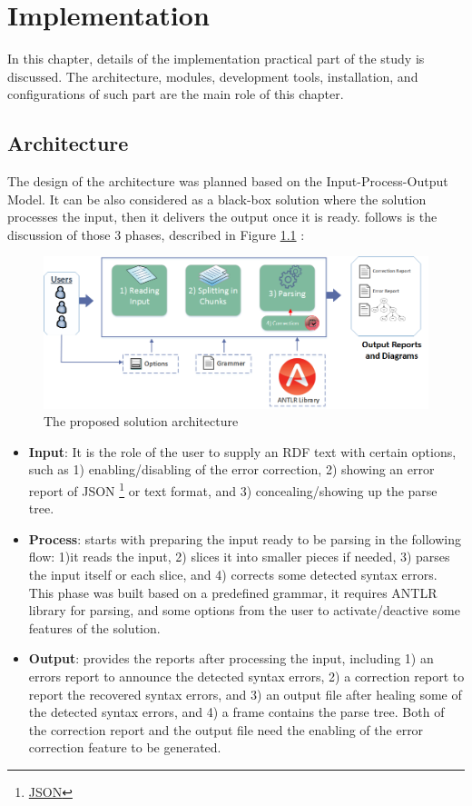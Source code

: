 \chapter{Implementation}
\label{ch:implementation}


In this chapter, details of the implementation practical part of the study is discussed. The architecture, modules, development tools, installation, and configurations of such part are the main role of this chapter.    
\section {Architecture}
The design of the architecture was planned based on the Input-Process-Output Model. It can be also considered as a black-box solution where the solution processes the input, then it delivers the output once it is ready. follows is the discussion of those 3 phases, described in Figure \ref{Fig:Architecture} : 
 \begin{figure}[ht]
	\begin{center}
		\includegraphics[scale=0.5,angle=0]{images/Architecture}
		\caption{The proposed solution architecture}
		\label{Fig:Architecture}
	\end{center}
\end{figure}
 \begin{itemize}
 \item \textbf {Input}: It is the role of the user to supply an RDF text with certain options, such as 1) enabling/disabling of the error correction, 2) showing an error report of JSON \footnote{\href{https://www.json.org/}{JSON}} or text format, and 3) concealing/showing up the parse tree.
\item \textbf{Process}: starts with preparing the input ready to be parsing in the following flow: 1)it reads the input, 2) slices it into smaller pieces if needed, 3) parses the input itself or each slice, and 4) corrects some detected syntax errors. This phase was built based on a predefined grammar, it requires ANTLR library for parsing, and some options from the user to activate/deactive some features of the solution.   
\item \textbf{Output}: provides the reports after processing the input, including 1) an errors report to announce the detected syntax errors, 2) a correction report to report the recovered syntax errors, and 3) an output file after healing some of the detected syntax errors, and 4) a frame contains the parse tree. Both of the correction report and the output file need the enabling of the error correction feature to be generated. 
\end{itemize}



